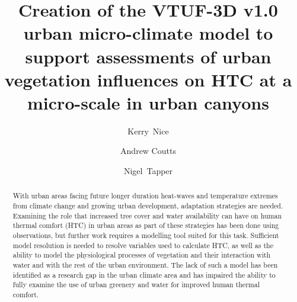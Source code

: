 \documentclass[preprint,12pt,authoryear]{elsarticle}
\begin{document}
\begin{frontmatter}



\title{Creation of the VTUF-3D v1.0 urban micro-climate model to support assessments of urban vegetation influences on HTC at a micro-scale in urban canyons}


\author[monash,crc]{Kerry~Nice}
\author[monash,crc]{Andrew Coutts}
\author[monash,crc]{Nigel~Tapper}
\address[monash]{School of Earth, Atmosphere and Environment, Monash University, Australia}
\address[crc]{CRC for Water Sensitive Cities, Australia}


\begin{abstract}

With urban areas facing future longer duration heat-waves and temperature extremes from climate change and growing urban development, adaptation strategies are needed. Examining the role that increased tree cover and water availability can have on human thermal comfort (HTC) in urban areas as part of these strategies has been done using observations, but further work requires a modelling tool suited for this task. Sufficient model resolution is needed to resolve variables used to calculate HTC, as well as the ability to model the physiological processes of vegetation and their interaction with water and with the rest of the urban environment. The lack of such a model has been identified as a research gap in the urban climate area and has impaired the ability to fully examine the use of urban greenery and water for improved human thermal comfort. 


\end{abstract}
\end{frontmatter}
\end{document}
